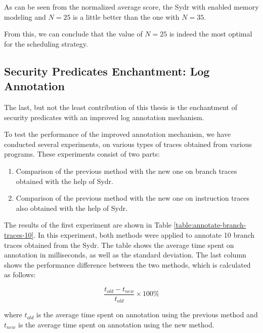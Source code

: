 As can be seen from the normalized average score, the Sydr with enabled memory modeling and $N=25$ is a little better than the one with $N=35$.

From this, we can conclude that the value of $N=25$ is indeed the most optimal for the scheduling strategy.

\subsection{Security Predicates Enchantment: Log Annotation} \label{results:security-invariants-enchantment-log-annotation}

The last, but not the least contribution of this thesis is the enchantment of security predicates with an improved log annotation mechanism.

To test the performance of the improved annotation mechanism, we have conducted several experiments, on various types of traces obtained from various programs. These experiments consist of two parts:

\begin{enumerate}
    \item Comparison of the previous method with the new one on branch traces obtained with the help of Sydr.
    \item Comparison of the previous method with the new one on instruction traces also obtained with the help of Sydr.
\end{enumerate}

The results of the first experiment are shown in Table \ref{table:annotate-branch-traces-10}. In this experiment, both methods were applied to annotate 10 branch traces obtained from the Sydr. The table shows the average time spent on annotation in milliseconds, as well as the standard deviation. The last column shows the performance difference between the two methods, which is calculated as follows:

$$ \frac{t_{old} - t_{new}}{t_{old}} \times 100 \% $$

where $t_{old}$ is the average time spent on annotation using the previous method and $t_{new}$ is the average time spent on annotation using the new method.

